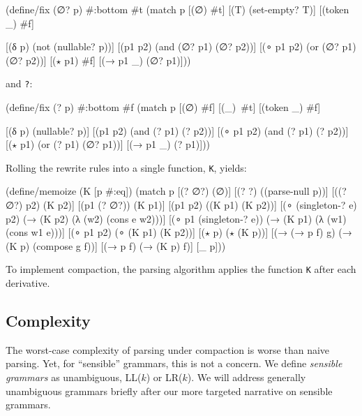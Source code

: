 %
%
\begin{code}
(define/fix (∅? p)
  #:bottom #t
  (match p
    [(∅)            #t]
    [(\ttepsred T)        (set-empty? T)]
    [(token _)      #f]

    [(δ p)          (not (nullable? p))]
    [(\ttcup p1 p2)      (and (∅? p1) (∅? p2))]
    [(∘ p1 p2)      (or  (∅? p1) (∅? p2))]
    [(\(\star\) p1)         #f]
    [(→ p1 _)      (∅? p1)]))\end{code}
 and \texttt{\ttepsilon?}:
\begin{code}
(define/fix (\ttepsilon? p)
  #:bottom #f
  (match p
    [(∅)            #f]
    [(\ttepsred _)        \,#t]
    [(token _)      #f]

    [(δ p)          (nullable? p)]
    [(\ttcup p1 p2)      (and (\ttepsilon? p1) (\ttepsilon? p2))]
    [(∘ p1 p2)      (and (\ttepsilon? p1) (\ttepsilon? p2))]
    [(\(\star\) p1)         (or  (\ttepsilon? p1) (∅? p1))]
    [(→ p1 _)      (\ttepsilon? p1)]))
\end{code}

Rolling the rewrite rules into a single function, {\tt K}, yields:
%
\begin{code}
(define/memoize (K [p #:eq])
  (match p
    [(? ∅?)                    (∅)]
    [(? \ttepsilon?)                    (\ttepsred (parse-null p))]
    [(\ttcup (? ∅?) p2)             (K p2)]
    [(\ttcup p1 (? ∅?))             (K p1)]
    [(\ttcup p1 p2)                 (\ttcup (K p1) (K p2))]
    [(∘ (singleton-\ttepsilon? e) p2)   (→ (K p2) (λ (w2) (cons e w2)))]
    [(∘ p1 (singleton-\ttepsilon? e))   (→ (K p1) (λ (w1) (cons w1 e)))]
    [(∘ p1 p2)                 (∘ (K p1) (K p2))]
    [(\(\star\) p)                     (\(\star\) (K p))]      
    [(→ (→ p f) g)           (→ (K p) (compose g f))]
    [(→ p f)                  (→ (K p) f)]
    [_                         p]))
\end{code}
%
To implement compaction, the parsing algorithm applies the function {\tt K}
after each derivative.


\subsection{Complexity}
%
The worst-case complexity of parsing under compaction is worse
than naive parsing.
%
Yet, for ``sensible'' grammars, this is not a concern.
%
We define \emph{sensible grammars} as
unambiguous, LL($k$) or LR($k$).
%
We will address generally unambiguous grammars briefly after our more targeted
narrative on sensible grammars.

